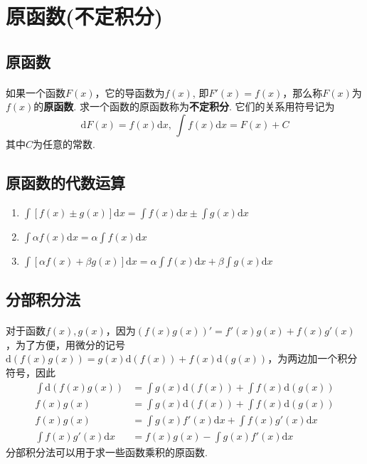 \section{原函数(不定积分)}

\subsection{原函数}
\paragraph{}
如果一个函数$F(x)$，它的导函数为$f(x)$, 即$F'(x) = f(x)$，那么称$F(x)$为$f(x)$的\textbf{原函数}. 求一个函数的原函数称为\textbf{不定积分}. 它们的关系用符号记为
$$
\mathrm{d} F(x) = f(x) \mathrm{d} x, \, \int f(x) \mathrm{d}x = F(x)  + C 
$$
其中$C$为任意的常数. 

\subsection{原函数的代数运算}
\begin{enumerate}
\item $\int [ f(x) \pm g(x)] \mathrm{d}x = \int f(x) \mathrm{d} x  \pm \int g(x) \mathrm{d} x $
\item $\int \alpha f(x) \mathrm{d}x = \alpha \int f(x) \mathrm{d} x$
\item $\int [\alpha f(x)  + \beta g(x)]\mathrm{d}x = \alpha \int f(x) \mathrm{d} x + \beta \int g(x) \mathrm{d} x $
\end{enumerate}

\subsection{分部积分法}
\paragraph{}
对于函数$f(x), g(x)$，因为$(f(x) g(x))' = f'(x)g(x) + f(x)g'(x)$，为了方便，用微分的记号$\mathrm{d} (f(x)g(x)) = g(x) \mathrm{d}(f(x)) + f(x) \mathrm{d}(g(x))$，为两边加一个积分符号，因此
\begin{align*}
\int \mathrm{d} (f(x)g(x)) & = \int g(x) \mathrm{d}(f(x)) + \int f(x) \mathrm{d}(g(x)) \\
f(x) g(x) & = \int g(x) \mathrm{d}(f(x)) +  \int f(x) \mathrm{d}(g(x)) \\
f(x) g(x) & = \int g(x) f'(x) \mathrm{d}x +  \int f(x) g'(x) \mathrm{d}x \\
\int f(x) g'(x) \mathrm{d}x  & = f(x) g(x)  -   \int g(x) f'(x) \mathrm{d}x
\end{align*}
分部积分法可以用于求一些函数乘积的原函数.

